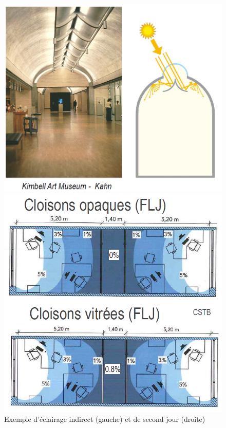 \documentclass[11pt]{report}
\begin{document}
\begin{figure}[h]
\begin{minipage}{0.5\linewidth}
\centering
\includegraphics[width=0.9\linewidth]{kimbell}
\end{minipage}
\begin{minipage}{0.5\linewidth}
\centering
\includegraphics[width=0.9\linewidth]{jour}
\end{minipage}
\caption{Exemple d'éclairage indirect (gauche) et de second jour (droite)}
\end{figure}
\end{document}
